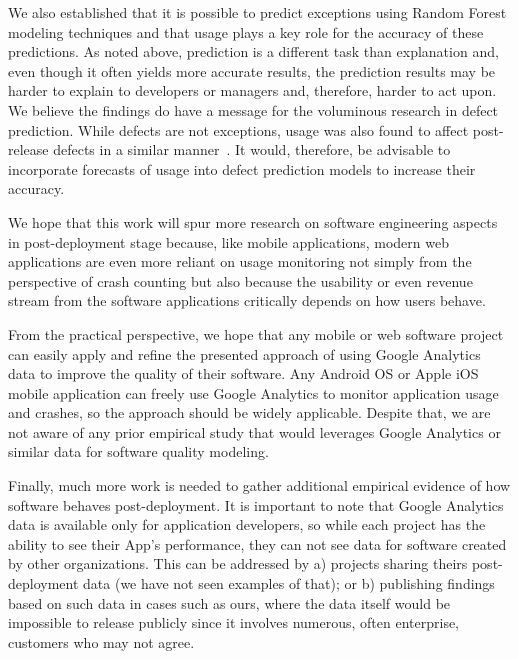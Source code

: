 \documentclass[smallextended]{svjour3}       %
\begin{document}
We also established
that it is possible to predict exceptions using Random Forest
modeling techniques and that usage plays a key role for the accuracy
of these predictions. As noted above, prediction is a different task
than explanation and, even though it often yields more accurate
results, the prediction results may be harder to explain to
developers or managers and, therefore, harder to act upon. We
believe the findings do have a message for the voluminous research
in defect prediction. While defects are not exceptions, usage was
also found to affect post-release defects in a similar
manner~\cite{caper,hmps15,mockus2005predictors}. It would, therefore, be advisable to 
incorporate forecasts of usage into defect prediction models  to increase their accuracy.

We hope that this work will spur more research on software engineering
aspects in post-deployment stage because, like mobile applications, 
modern web applications are even more reliant on usage monitoring not
simply from the perspective of crash counting but also because the
usability or even revenue stream from the software applications
critically depends on how users behave. 

From the practical perspective, we hope that any mobile or web
software project can easily apply and refine the presented approach
of using Google Analytics data to improve the quality of their
software.  Any Android OS or Apple iOS mobile application can freely use
Google Analytics to monitor application usage and crashes, so the
approach should be widely applicable. Despite that, we 
are not aware of any prior empirical study that would leverages Google
Analytics or similar data for software quality modeling.


Finally, much more work is needed to gather additional empirical
evidence of how software behaves post-deployment. It is important to
note that Google Analytics data is available only for application
developers, so while each project has the ability to see their App's
performance, they can not see data for software created by other
organizations. This can be addressed by a) projects sharing theirs
post-deployment data (we have not seen examples of that); or b)
publishing findings based on such data in cases such as ours,
where the data itself would be impossible to release publicly since
it involves numerous, often enterprise, customers who may not agree.





\end{document}
